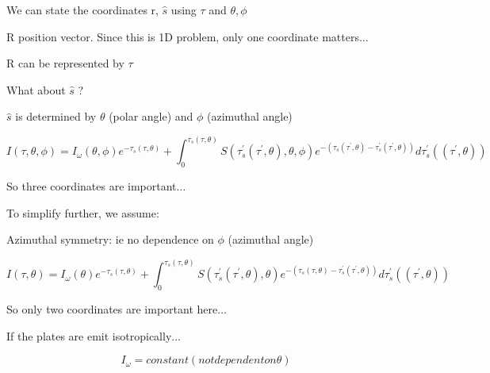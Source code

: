\documentclass[12pt]{article}
\renewcommand{\_}{\kern-1.5pt\textunderscore\kern-1.5pt}
\begin{document}
We can state the coordinates r, \( \hat{s} \)  using  \(  \tau \)  and  \(  \theta , \phi  \) \par

R  position vector. Since this is 1D problem, only one coordinate matters$ \ldots $ \par

R can be represented by  \(  \tau \) \par

What about  \( \hat{s} \) ?\par

 \( \hat{s} \)  is determined by  \(  \theta  \)  (polar angle) and  \(  \phi  \)  (azimuthal angle)\par

 \[ I \left(  \tau, \theta , \phi  \right) =I_{ \omega } \left(  \theta , \phi  \right) e^{- \tau_{s} \left(  \tau, \theta  \right) }+ \int _{0}^{ \tau_{s} \left(  \tau, \theta  \right) }S \left(  \tau_{s}^{'} \left(  \tau^{'}, \theta  \right) , \theta , \phi  \right) e^{- \left(  \tau_{s} \left(  \tau^{'}, \theta  \right) - \tau_{s}^{'} \left(  \tau^{'}, \theta  \right)  \right) }d \tau_{s}^{'} \left(  \left(  \tau^{'}, \theta  \right)  \right)  \] \par

So three coordinates are important$ \ldots $ \par

To simplify further, we assume:\par

Azimuthal symmetry: ie no dependence on  \(  \phi  \)  (azimuthal angle)\par

 \[ I \left(  \tau, \theta  \right) =I_{ \omega } \left(  \theta  \right) e^{- \tau_{s} \left(  \tau, \theta  \right) }+ \int _{0}^{ \tau_{s} \left(  \tau, \theta  \right) }S \left(  \tau_{s}^{'} \left(  \tau^{'}, \theta  \right) , \theta  \right) e^{- \left(  \tau_{s} \left(  \tau, \theta  \right) - \tau_{s}^{'} \left(  \tau^{'}, \theta  \right)  \right) }d \tau_{s}^{'} \left(  \left(  \tau^{'}, \theta  \right)  \right)  \] \par

So only two coordinates are important here$ \ldots $ \par

If the plates are emit isotropically$ \ldots $ \par

 \[ I_{ \omega }=constant  \left( not dependent on  \theta  \right)   \] \par
\end{document}
